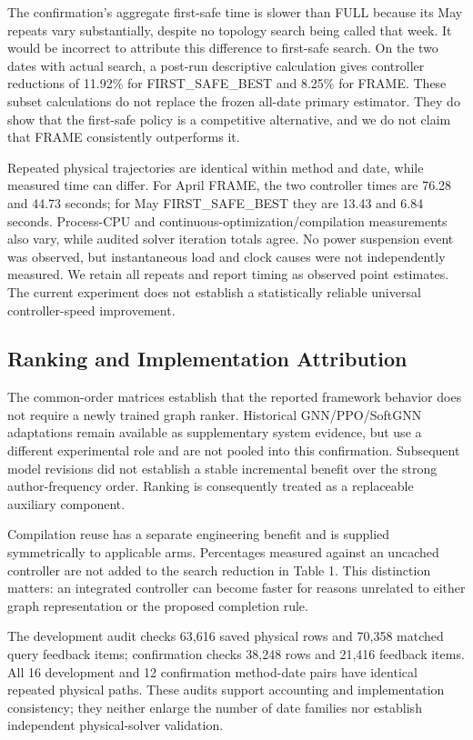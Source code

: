 The confirmation's aggregate first-safe time is slower than FULL because its May repeats vary substantially, despite no topology search being called that week. It would be incorrect to attribute this difference to first-safe search. On the two dates with actual search, a post-run descriptive calculation gives controller reductions of 11.92\% for FIRST\_SAFE\_BEST and 8.25\% for FRAME. These subset calculations do not replace the frozen all-date primary estimator. They do show that the first-safe policy is a competitive alternative, and we do not claim that FRAME consistently outperforms it.


Repeated physical trajectories are identical within method and date, while measured time can differ. For April FRAME, the two controller times are 76.28 and 44.73 seconds; for May FIRST\_SAFE\_BEST they are 13.43 and 6.84 seconds. Process-CPU and continuous-optimization/compilation measurements also vary, while audited solver iteration totals agree. No power suspension event was observed, but instantaneous load and clock causes were not independently measured. We retain all repeats and report timing as observed point estimates. The current experiment does not establish a statistically reliable universal controller-speed improvement.


\subsection{Ranking and Implementation Attribution}

The common-order matrices establish that the reported framework behavior does not require a newly trained graph ranker. Historical GNN/PPO/SoftGNN adaptations remain available as supplementary system evidence, but use a different experimental role and are not pooled into this confirmation. Subsequent model revisions did not establish a stable incremental benefit over the strong author-frequency order. Ranking is consequently treated as a replaceable auxiliary component.


Compilation reuse has a separate engineering benefit and is supplied symmetrically to applicable arms. Percentages measured against an uncached controller are not added to the search reduction in Table 1. This distinction matters: an integrated controller can become faster for reasons unrelated to either graph representation or the proposed completion rule.


The development audit checks 63,616 saved physical rows and 70,358 matched query feedback items; confirmation checks 38,248 rows and 21,416 feedback items. All 16 development and 12 confirmation method-date pairs have identical repeated physical paths. These audits support accounting and implementation consistency; they neither enlarge the number of date families nor establish independent physical-solver validation.


